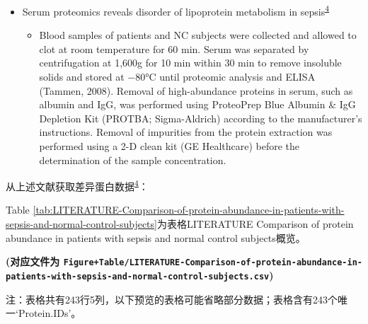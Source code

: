 \documentclass[
]{article}
\providecommand{\tightlist}{%
  \setlength{\itemsep}{0pt}\setlength{\parskip}{0pt}}
\begin{document}
\begin{itemize}
\tightlist
\item
  Serum proteomics reveals disorder of lipoprotein metabolism in
  sepsis\textsuperscript{\protect\hyperlink{ref-SerumProteomicLiang2021}{4}}

  \begin{itemize}
  \tightlist
  \item
    Blood samples of patients and NC subjects were collected and allowed to
    clot at room temperature for 60 min. Serum was separated by
    centrifugation at 1,600g for 10 min within 30 min to remove insoluble
    solids and stored at −80°C until proteomic analysis and ELISA (Tammen,
    2008). Removal of high-abundance proteins in serum, such as albumin and
    IgG, was performed using ProteoPrep Blue Albumin \& IgG Depletion Kit
    (PROTBA; Sigma-Aldrich) according to the manufacturer's instructions.
    Removal of impurities from the protein extraction was performed using a
    2-D clean kit (GE Healthcare) before the determination of the sample
    concentration.
  \end{itemize}
\end{itemize}

从上述文献获取差异蛋白数据\textsuperscript{\protect\hyperlink{ref-SerumProteomicLiang2021}{4}}：

Table \ref{tab:LITERATURE-Comparison-of-protein-abundance-in-patients-with-sepsis-and-normal-control-subjects}为表格LITERATURE Comparison of protein abundance in patients with sepsis and normal control subjects概览。

\textbf{(对应文件为 \texttt{Figure+Table/LITERATURE-Comparison-of-protein-abundance-in-patients-with-sepsis-and-normal-control-subjects.csv})}

\begin{center}\begin{tcolorbox}[colback=gray!10, colframe=gray!50, width=0.9\linewidth, arc=1mm, boxrule=0.5pt]注：表格共有243行5列，以下预览的表格可能省略部分数据；表格含有243个唯一`Protein.IDs'。
\end{tcolorbox}
\end{center}
\end{document}
